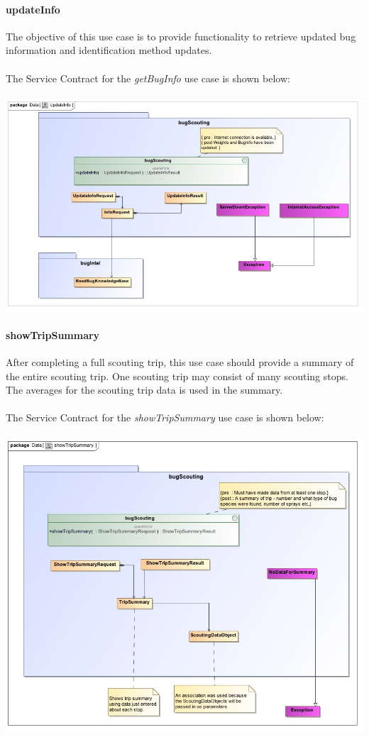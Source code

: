 \documentclass[11pt,a4paper,titlepage]{article}
\begin{document}
		\paragraph{updateInfo }
		The objective of this use case is to provide functionality to retrieve updated bug information and identification method updates.\\\hfill\\
		The Service Contract for the \textit{getBugInfo} use case is shown below:\\\hfill\\
		\includegraphics[width=\linewidth]{updateInfo}
		
		\paragraph{showTripSummary }
		After completing a full scouting trip, this use case should provide a summary of the entire scouting trip. One scouting trip may consist of many scouting stops. The averages for the scouting trip data is used in the summary.\\\hfill\\
		The Service Contract for the \textit{showTripSummary} use case is shown below:\\\hfill\\
		\includegraphics[width=\linewidth]{showTripSummary}
		
\end{document}
